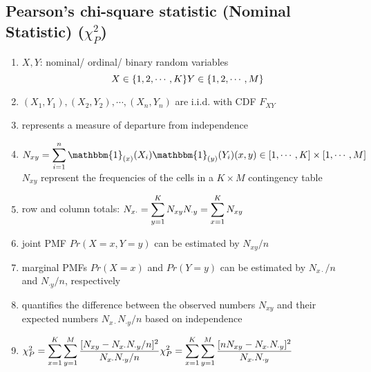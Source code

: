 \subsection{Pearson’s chi-square statistic (Nominal Statistic) ($\chi_P^2$) \cite{ism-1}} \label{Multivariate Distributions: Pearson’s chi-square statistic (Nominal Statistic)}

\begin{enumerate}
    \item[] $X, Y$: nominal/ ordinal/ binary random variables
    \[
        \hfill
        X \in \{1, 2,\cdots, K\}
        \hfill
        Y \in \{1, 2,\cdots, M\}
        \hfill
    \]

    \item[] $(X_1, Y_1), (X_2, Y_2), \cdots , (X_n, Y_n)$ are i.i.d. with CDF $F_{XY}$

    \item represents a measure of departure from independence

    \item $
        N_{xy}
        = \dsum_{i=1}^{n} 
        \mathbbm{1}_{(x)}(X_i)
        \mathbbm{1}_{(y)}(Y_i)
        \hfill
        (x,y) \in [1,\cdots,K] \times [1,\cdots,M]
    $\\
    $N_{xy}$ represent the frequencies of the cells in a $K \times M$ contingency table
    
    \item row and column totals: $
        \hfill
        N_{x\cdot} = \dsum_{y=1}^{K} N_{xy}
        \hfill
        N_{\cdot y} = \dsum_{x=1}^{K} N_{xy}
        \hfill
    $

    \item joint PMF $Pr(X = x, Y = y)$ can be estimated by $N_{xy}/n$

    \item marginal PMFs $Pr(X = x)$ and $Pr(Y = y)$ can be estimated by $N_{x\cdot}/n$ and $N_{\cdot y}/n$, respectively

    \item quantifies the difference between the observed numbers $N_{xy}$ and their expected numbers $N_{x\cdot}N_{\cdot y}/n$ based on independence

    \item $
        \hfill
        \chi_P^2 = \dsum_{x=1}^{K} \dsum_{y=1}^{M}
        \dfrac{[N_{xy} - N_{x\cdot}N_{\cdot y}/n]^2}{N_{x\cdot}N_{\cdot y}/n}
        \hfill
        \chi_P^2 = \dsum_{x=1}^{K} \dsum_{y=1}^{M}
        \dfrac{[nN_{xy} - N_{x\cdot}N_{\cdot y}]^2}{N_{x\cdot}N_{\cdot y}}
        \hfill
    $


\end{enumerate}
